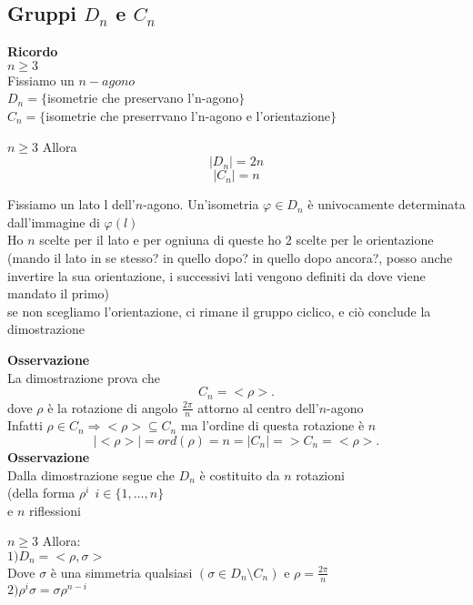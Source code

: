 \documentclass[12px]{article}
\begin{document}
 \subsection{Gruppi $D_n$ e $C_n$}
  \textbf{Ricordo}\\
  $n\geq 3$\\
  Fissiamo un  $n-agono$ \\
  $D_n = \lbrace$isometrie che preservano l'n-agono$\rbrace$\\
   $C_n  = \lbrace$isometrie che preserrvano l'n-agono e l'orientazione$\rbrace$\\
 \begin{teo}
 	$n\geq 3$ Allora\\
	\[|D_n| = 2n\]
\[|C_n| = n\]
 \end{teo}
 \begin{dimo}
	 Fissiamo un lato l dell'$n$-agono. Un'isometria $ \varphi\in D_n$ è univocamente determinata dall'immagine di $ \varphi(l)$\\
	 Ho $n$ scelte per il lato e per ogniuna di queste ho 2 scelte per le orientazione (mando il lato in se stesso? in quello dopo? in quello dopo ancora?, posso anche invertire la sua orientazione, i successivi lati vengono definiti da dove viene mandato il primo)\\
	 se non scegliamo l'orientazione, ci rimane il gruppo ciclico, e ciò conclude la dimostrazione
 \end{dimo}
 \textbf{Osservazione}\\
 La dimostrazione prova che
 \[
  C_n = <\rho>
 .\]
 dove $\rho$ è la rotazione di angolo $\frac {2\pi}{n}$ attorno al centro dell'$n$-agono\\
 Infatti $\rho\in C_n \Rightarrow <\rho>\subseteq C_n$ ma l'ordine di questa rotazione è $n$
  \[
 |<\rho>| = ord(\rho) = n = |C_n| => C_n = <\rho>
 .\] 
 \textbf{Osservazione}\\
 Dalla dimostrazione segue che $D_n$ è costituito da $n$ rotazioni \\(della forma $\rho^i \ \ i\in\lbrace 1,\ldots, n\rbrace$ \\
 e $n$ riflessioni\\
 \begin{prop}
 	$n\geq 3$ Allora:\\
	 $1)D_n = <\rho,\sigma >$\\
	 Dove  $\sigma$ è una simmetria qualsiasi  $(\sigma \in D_n\setminus C_n)$ e $\rho = \frac{2\pi}{n}$ \\
	 $2)\rho^i \sigma = \sigma \rho^{n-i}$ 
 \end{prop}
\end{document}
